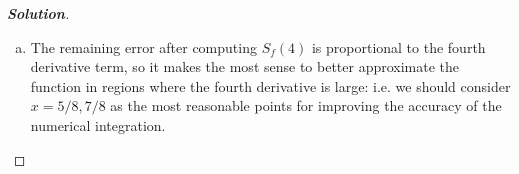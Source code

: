 \documentclass[11pt]{article}
\newenvironment{solution}{%
  \begin{proof}[\textbf{Solution}]$ $\par\nobreak\ignorespaces
}{%
  \end{proof}
}
\theoremstyle{definition}
\begin{document}
\begin{solution}
\begin{enumerate}[(a)]
\begin{align*}
    S_f(4) &= \frac{1}{3}[4T_f(4) - T_f(2)] \\
    &= \frac{1}{3}[4(1) - 1] \\
    &= 1
\end{align*}
\item The remaining error after computing $S_f(4)$ is proportional to the fourth derivative term, so it makes the most sense to better approximate the function in regions where the fourth derivative is large: i.e. we should consider $x = 5/8, 7/8$ as the most reasonable points for improving the accuracy of the numerical integration.
\end{enumerate}
\end{solution}
\end{document}
